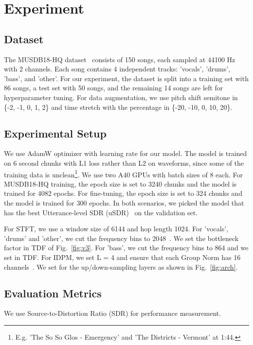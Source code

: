 

\section{Experiment}
\subsection{Dataset}

The MUSDB18-HQ dataset~\cite{MUSDB18} consists of 150 songs, each sampled at 44100 Hz with 2 channels. Each song contains 4 independent tracks: 'vocals', 'drums', 'bass', and 'other'. For our experiment, the dataset is split into a training set with 86 songs, a test set with 50 songs, and the remaining 14 songs are left for hyperparameter tuning. For data augmentation, we use pitch shift semitone in \{-2, -1, 0, 1, 2\} and time stretch with the percentage in \{-20, -10, 0, 10, 20\}.

\subsection{Experimental Setup}
We use AdamW optimizer with learning rate  for our model. The model is trained on 6 second chunks with L1 loss rather than L2 on waveforms, since some of the training data is unclean\footnote{E.g. 'The So So Glos - Emergency' and 'The Districts - Vermont' at 1:44.}. We use two A40 GPUs with batch sizes of 8 each. For MUSDB18-HQ training, the epoch size is set to 3240 chunks and the model is trained for 4082 epochs. For fine-tuning, the epoch size is set to 324 chunks and the model is trained for 300 epochs. In both scenarios, we picked the model that has the best Utterance-level SDR (uSDR)~\cite{mitsufuji_music_2022} on the validation set. 

For STFT, we use a window size of 6144 and hop length 1024. For 'vocals', 'drums' and 'other', we cut the frequency bins to 2048~\cite{kimKUIELabMDXNetTwoStreamNeural2021}. We set the bottleneck factor  in TDF of Fig.~\ref{fig:v3}. For 'bass', we cut the frequency bins to 864 and we set  in TDF. For IDPM, we set L = 4 and ensure that each Group Norm has 16 channels~\cite{wu_group_2018}. We set  for the up/down-sampling layers as shown in Fig.~\ref{fig:arch}.

\subsection{Evaluation Metrics}
We use Source-to-Distortion Ratio (SDR) for performance measurement.

